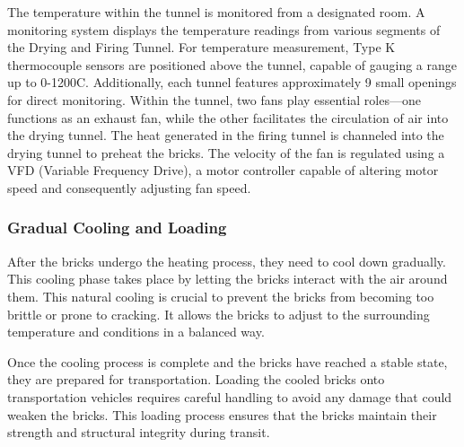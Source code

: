 The temperature within the tunnel is monitored from a designated room. A monitoring system displays the temperature readings from various segments of the Drying and Firing Tunnel. For temperature measurement, Type K thermocouple sensors are positioned above the tunnel, capable of gauging a range up to 0-1200\degree C. Additionally, each tunnel features approximately 9 small openings for direct monitoring. Within the tunnel, two fans play essential roles—one functions as an exhaust fan, while the other facilitates the circulation of air into the drying tunnel. The heat generated in the firing tunnel is channeled into the drying tunnel to preheat the bricks. The velocity of the fan is regulated using a VFD (Variable Frequency Drive), a motor controller capable of altering motor speed and consequently adjusting fan speed.

\subsubsection{Gradual Cooling and Loading}
After the bricks undergo the heating process, they need to cool down gradually. This cooling phase takes place by letting the bricks interact with the air around them. This natural cooling is crucial to prevent the bricks from becoming too brittle or prone to cracking. It allows the bricks to adjust to the surrounding temperature and conditions in a balanced way.

Once the cooling process is complete and the bricks have reached a stable state, they are prepared for transportation. Loading the cooled bricks onto transportation vehicles requires careful handling to avoid any damage that could weaken the bricks. This loading process ensures that the bricks maintain their strength and structural integrity during transit.